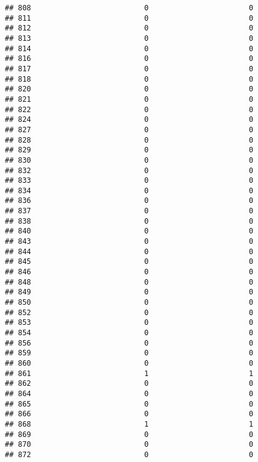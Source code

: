 \documentclass[
]{article}
\begin{document}
\begin{verbatim}
## 808                          0                       0
## 811                          0                       0
## 812                          0                       0
## 813                          0                       0
## 814                          0                       0
## 816                          0                       0
## 817                          0                       0
## 818                          0                       0
## 820                          0                       0
## 821                          0                       0
## 822                          0                       0
## 824                          0                       0
## 827                          0                       0
## 828                          0                       0
## 829                          0                       0
## 830                          0                       0
## 832                          0                       0
## 833                          0                       0
## 834                          0                       0
## 836                          0                       0
## 837                          0                       0
## 838                          0                       0
## 840                          0                       0
## 843                          0                       0
## 844                          0                       0
## 845                          0                       0
## 846                          0                       0
## 848                          0                       0
## 849                          0                       0
## 850                          0                       0
## 852                          0                       0
## 853                          0                       0
## 854                          0                       0
## 856                          0                       0
## 859                          0                       0
## 860                          0                       0
## 861                          1                       1
## 862                          0                       0
## 864                          0                       0
## 865                          0                       0
## 866                          0                       0
## 868                          1                       1
## 869                          0                       0
## 870                          0                       0
## 872                          0                       0

\end{verbatim}
\end{document}
